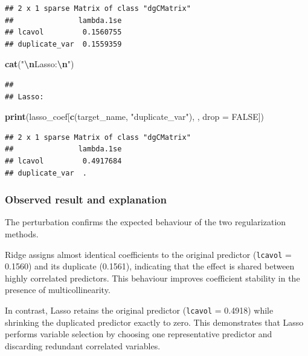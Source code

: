 \documentclass[
  11pt,
]{article}
\newenvironment{Shaded}{\begin{snugshade}}{\end{snugshade}}
\newcommand{\AttributeTok}[1]{\textcolor[rgb]{0.13,0.29,0.53}{#1}}
\newcommand{\ConstantTok}[1]{\textcolor[rgb]{0.56,0.35,0.01}{#1}}
\newcommand{\FunctionTok}[1]{\textcolor[rgb]{0.13,0.29,0.53}{\textbf{#1}}}
\newcommand{\NormalTok}[1]{#1}
\newcommand{\SpecialCharTok}[1]{\textcolor[rgb]{0.81,0.36,0.00}{\textbf{#1}}}
\newcommand{\StringTok}[1]{\textcolor[rgb]{0.31,0.60,0.02}{#1}}
\begin{document}
\begin{verbatim}
## 2 x 1 sparse Matrix of class "dgCMatrix"
##               lambda.1se
## lcavol         0.1560755
## duplicate_var  0.1559359
\end{verbatim}

\begin{Shaded}
\begin{Highlighting}[]
\FunctionTok{cat}\NormalTok{(}\StringTok{"}\SpecialCharTok{\textbackslash{}n}\StringTok{Lasso:}\SpecialCharTok{\textbackslash{}n}\StringTok{"}\NormalTok{)}
\end{Highlighting}
\end{Shaded}

\begin{verbatim}
## 
## Lasso:
\end{verbatim}

\begin{Shaded}
\begin{Highlighting}[]
\FunctionTok{print}\NormalTok{(lasso\_coef[}\FunctionTok{c}\NormalTok{(target\_name, }\StringTok{"duplicate\_var"}\NormalTok{), , }\AttributeTok{drop =} \ConstantTok{FALSE}\NormalTok{])}
\end{Highlighting}
\end{Shaded}

\begin{verbatim}
## 2 x 1 sparse Matrix of class "dgCMatrix"
##               lambda.1se
## lcavol         0.4917684
## duplicate_var  .
\end{verbatim}

\subsubsection{Observed result and
explanation}\label{observed-result-and-explanation}

The perturbation confirms the expected behaviour of the two
regularization methods.

Ridge assigns almost identical coefficients to the original predictor
(\texttt{lcavol} = 0.1560) and its duplicate (0.1561), indicating that
the effect is shared between highly correlated predictors. This
behaviour improves coefficient stability in the presence of
multicollinearity.

In contrast, Lasso retains the original predictor (\texttt{lcavol} =
0.4918) while shrinking the duplicated predictor exactly to zero. This
demonstrates that Lasso performs variable selection by choosing one
representative predictor and discarding redundant correlated variables.
\end{document}
